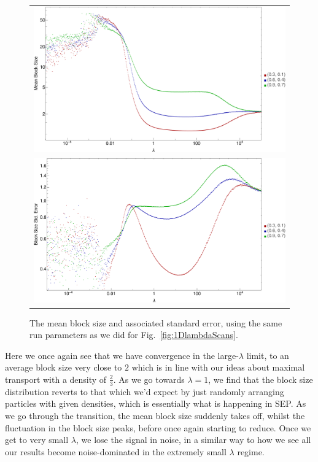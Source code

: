 \begin{figure} \caption[The mean block size and its standard error.]{The mean block size and associated
standard error, using the same run parameters as we did for Fig.~\ref{fig:1DlambdaScans}.} 
\label{fig:blockSizeDistn}
\begin{center}
\begin{tabular}{c} 
\includegraphics[width=1.0\linewidth]{numerics/images/lambdaScan/blockSizeMeans} \\
\includegraphics[width=1.0\linewidth]{numerics/images/lambdaScan/blockSizeStdErr} \\
\end{tabular}
\end{center}
\end{figure}
Here we once again see that we have convergence in the large-$\lambda$ limit, to an average block
size very close to $2$ which is in line with our ideas about maximal transport with a density of 
$\frac{2}{3}$. As we go towards $\lambda=1$, we find that the block size distribution reverts to
that which we'd expect by just randomly arranging particles with given densities, which is essentially
what is happening in SEP. As we go through the transition, the mean block size suddenly takes off,
whilst the fluctuation in the block size peaks, before once again starting to reduce. Once we get to 
very small $\lambda$, we lose the signal in noise, in a similar way to how we see all our results become
noise-dominated in the extremely small $\lambda$ regime.


